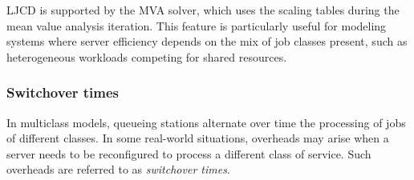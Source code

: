 LJCD is supported by the MVA solver, which uses the scaling tables during the mean value analysis iteration. This feature is particularly useful for modeling systems where server efficiency depends on the mix of job classes present, such as heterogeneous workloads competing for shared resources.

\subsubsection{Switchover times}
In multiclass models, queueing stations alternate over time the processing of jobs of different classes. In some real-world situations, overheads may arise when a server needs to be reconfigured to process a different class of service. Such overheads are referred to as \textit{switchover times}.

